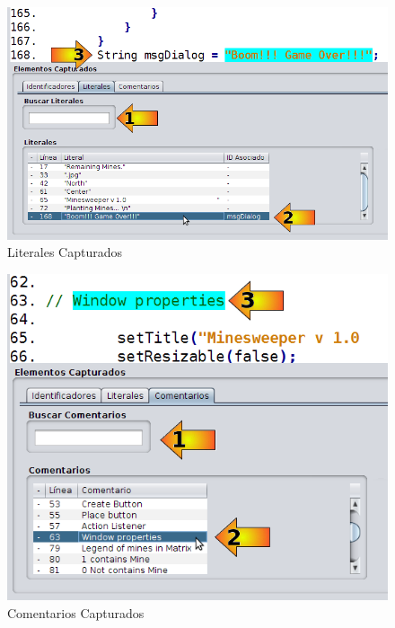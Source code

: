 \documentclass[a4paper,12pt]{report}
\begin{document}
\begin{figure}[t] %
\centerline{%
\includegraphics[scale= 0.5]{./ida_04.png}
}
\caption{Literales Capturados}
\label{ida4}
\end{figure}

\begin{figure}[t] %
\centerline{%
\includegraphics[scale= 0.43]{./ida_05.png}
}
\caption{Comentarios Capturados}
\label{ida5}
\end{figure}
\end{document}
